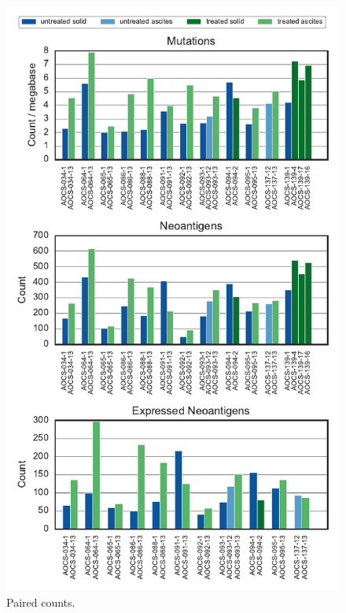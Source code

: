 \begin{figure}
\centering
\includegraphics[scale=1.0]{figures/paired_counts.pdf}
\caption{Paired counts. }
\label{sfig:supp_paired}
\end{figure}

